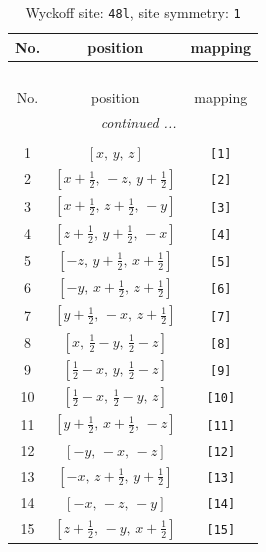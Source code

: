 \documentclass[fleqn,8pt]{jsarticle}
\begin{document}
\begin{longtable}{ccc}
\caption{Wyckoff site: {\tt 48l}, site symmetry: {\tt 1}}
 \\
 \hline \hline
No. & position & mapping \\ \hline \endfirsthead

\multicolumn{2}{l}{\tablename\ \thetable{}} \\
 \hline \hline
No. & position & mapping \\ \hline \endhead

 \hline \hline
\multicolumn{2}{r}{\footnotesize\it continued ...} \\ \endfoot

 \hline \hline
\multicolumn{2}{r}{} \\ \endlastfoot

1 & $\left[ x,\, y,\, z \right]$ & {\tt [1]} \\ \hline
2 & $\left[ x + \frac{1}{2},\, - z,\, y + \frac{1}{2} \right]$ & {\tt [2]} \\ \hline
3 & $\left[ x + \frac{1}{2},\, z + \frac{1}{2},\, - y \right]$ & {\tt [3]} \\ \hline
4 & $\left[ z + \frac{1}{2},\, y + \frac{1}{2},\, - x \right]$ & {\tt [4]} \\ \hline
5 & $\left[ - z,\, y + \frac{1}{2},\, x + \frac{1}{2} \right]$ & {\tt [5]} \\ \hline
6 & $\left[ - y,\, x + \frac{1}{2},\, z + \frac{1}{2} \right]$ & {\tt [6]} \\ \hline
7 & $\left[ y + \frac{1}{2},\, - x,\, z + \frac{1}{2} \right]$ & {\tt [7]} \\ \hline
8 & $\left[ x,\, \frac{1}{2} - y,\, \frac{1}{2} - z \right]$ & {\tt [8]} \\ \hline
9 & $\left[ \frac{1}{2} - x,\, y,\, \frac{1}{2} - z \right]$ & {\tt [9]} \\ \hline
10 & $\left[ \frac{1}{2} - x,\, \frac{1}{2} - y,\, z \right]$ & {\tt [10]} \\ \hline
11 & $\left[ y + \frac{1}{2},\, x + \frac{1}{2},\, - z \right]$ & {\tt [11]} \\ \hline
12 & $\left[ - y,\, - x,\, - z \right]$ & {\tt [12]} \\ \hline
13 & $\left[ - x,\, z + \frac{1}{2},\, y + \frac{1}{2} \right]$ & {\tt [13]} \\ \hline
14 & $\left[ - x,\, - z,\, - y \right]$ & {\tt [14]} \\ \hline
15 & $\left[ z + \frac{1}{2},\, - y,\, x + \frac{1}{2} \right]$ & {\tt [15]} \\ \hline

\end{longtable}
\end{document}
